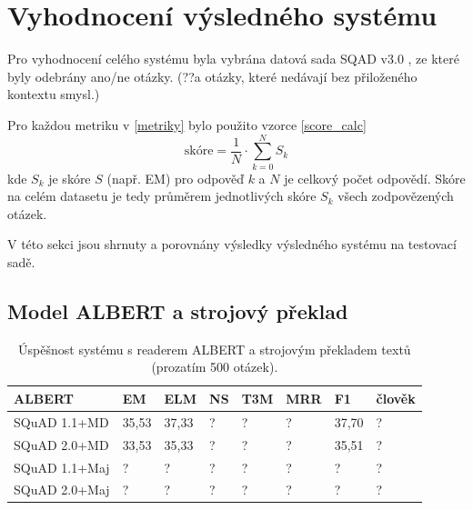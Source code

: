 \section{Vyhodnocení výsledného systému}
Pro vyhodnocení celého systému byla vybrána datová sada SQAD v3.0 \cite{sqad}, ze které byly odebrány ano/ne otázky. (??a otázky, které nedávají bez přiloženého kontextu smysl.)\par
Pro každou metriku v \ref{metriky} bylo použito vzorce \ref{score_calc}
\begin{equation}
    \label{score_calc}
    \text{skóre} = \frac{1}{N}\cdot \sum^N_{k=0} S_k
\end{equation}
kde $S_k$ je skóre $S$ (např. EM) pro odpověď $k$ a $N$ je celkový počet odpovědí. Skóre na celém datasetu je tedy průměrem jednotlivých skóre $S_k$ všech zodpovězených otázek.

V této sekci jsou shrnuty a porovnány výsledky výsledného systému na testovací sadě.

\subsection{Model ALBERT a strojový překlad}
\begin{table}[H]
    \centering
    \begin{tabular}{|l|l|l|l|l|l|l|l|}
        \hline
        \textbf{ALBERT} & EM    & ELM   & NS    & T3M   & MRR   & F1        & člověk \\ \hline
        SQuAD 1.1+MD    & 35,53 & 37,33 & ?     & ?     & ?     & 37,70     & ?      \\ \hline
        SQuAD 2.0+MD    & 33,53 & 35,33 & ?     & ?     & ?     & 35,51     & ?      \\ \hline
        SQuAD 1.1+Maj   & ?     & ?     & ?     & ?     & ?     & ?         & ?      \\ \hline
        SQuAD 2.0+Maj   & ?     & ?     & ?     & ?     & ?     & ?         & ?      \\ \hline
    \end{tabular}
    \caption{Úspěšnost systému s readerem ALBERT a strojovým překladem textů (prozatím 500 otázek).}
    \label{tab:system_eval_albert}
\end{table}

